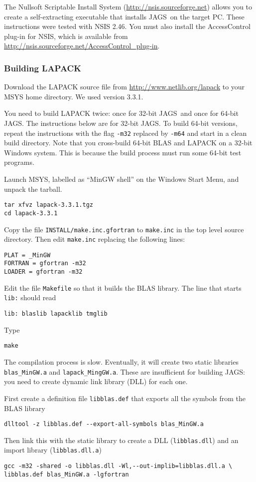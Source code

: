 \documentclass[11pt, a4paper, titlepage]{article}
\newcommand{\JAGS}{\textsf{JAGS}}
\begin{document}
The Nullsoft Scriptable Install System
(\url{http://nsis.sourceforge.net}) allows you to create a
self-extracting executable that installs \JAGS\ on the target PC.
These instructions were tested with NSIS 2.46.  You must also install
the AccessControl plug-in for NSIS, which is available from
\url{http://nsis.sourceforge.net/AccessControl_plug-in}.

\subsubsection{Building LAPACK}

Download the LAPACK source file from
\url{http://www.netlib.org/lapack} to your MSYS home directory. We
used version 3.3.1.

You need to build LAPACK twice: once for 32-bit \JAGS\ and once for
64-bit \JAGS. The instructions below are for 32-bit \JAGS. To build
64-bit versions, repeat the instructions with the flag \verb+-m32+
replaced by \verb+-m64+ and start in a clean build directory.  Note
that you cross-build 64-bit BLAS and LAPACK on a 32-bit Windows
system. This is because the build process must run some 64-bit test
programs.

Launch MSYS, labelled as ``MinGW shell'' on the Windows Start Menu,
and unpack the tarball.
\begin{verbatim}
tar xfvz lapack-3.3.1.tgz
cd lapack-3.3.1
\end{verbatim}
Copy the file \texttt{INSTALL/make.inc.gfortran} to \texttt{make.inc} in
the top level source directory.  Then edit \texttt{make.inc} replacing
the following lines:
\begin{verbatim}
PLAT = _MinGW
FORTRAN = gfortran -m32
LOADER = gfortran -m32
\end{verbatim}
Edit the file \texttt{Makefile} so that it builds the BLAS library. The
line that starts \texttt{lib:} should read
\begin{verbatim}
lib: blaslib lapacklib tmglib
\end{verbatim}
Type
\begin{verbatim}
make 
\end{verbatim}
The compilation process is slow. Eventually, it will create two static
libraries \verb+blas_MinGW.a+ and \verb+lapack_MingGW.a+. These are
insufficient for building \JAGS: you need to create dynamic link
library (DLL) for each one.

First create a definition file \verb+libblas.def+ that exports all the
symbols from the BLAS library
\begin{verbatim}
dlltool -z libblas.def --export-all-symbols blas_MinGW.a
\end{verbatim}
Then link this with the static library to create a DLL
(\verb+libblas.dll+) and an import library (\verb+libblas.dll.a+)
\begin{verbatim}
gcc -m32 -shared -o libblas.dll -Wl,--out-implib=libblas.dll.a \
libblas.def blas_MinGW.a -lgfortran
\end{verbatim}
 
\end{document}
